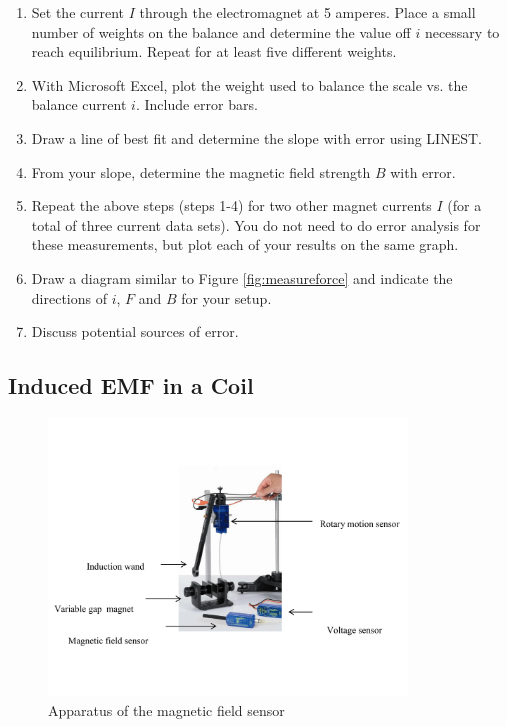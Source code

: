 \begin{enumerate}
 \item Set the current $I$ through the electromagnet at 5 amperes. Place a small number of weights on the balance and determine the value off $i$ necessary to reach equilibrium. Repeat for at least five different weights.

 \item With Microsoft Excel, plot the weight used to balance the scale vs. the balance current $i$. Include error bars.

 \item Draw a line of best fit and determine the slope with error using LINEST.

 \item From your slope, determine the magnetic field strength $B$ with error.

 \item Repeat the above steps (steps 1-4) for two other magnet currents $I$ (for a total of three current data sets). You do not need to do error analysis for these measurements, but plot each of your results on the same graph.

 \item Draw a diagram similar to Figure \ref{fig:measureforce} and indicate the directions of $i$, $F$ and $B$ for your setup.

 \item Discuss potential sources of error.
\end{enumerate}

\subsection{Induced EMF in a Coil}

\begin{figure}[h]
\centering
\includegraphics[width=0.85\textwidth]{./Exp4/pic/emf_setup.png}
\caption{Apparatus of the magnetic field sensor}
\label{fig:emfsetup}
\end{figure}

